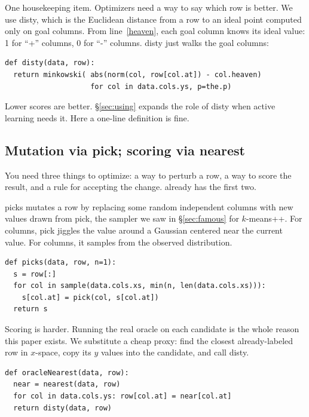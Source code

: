 One housekeeping item. Optimizers need a way to say which row is
better. We use \textsf{disty}, which is the Euclidean distance
from a row to an ideal point computed only on goal columns. From
line~\ref{heaven}, each goal column knows its ideal value: 1 for
``+'' columns, 0 for ``-'' columns. \textsf{disty} just walks the
goal columns:

\begin{verbatim}
def disty(data, row): 
  return minkowski( abs(norm(col, row[col.at]) - col.heaven)
                    for col in data.cols.ys, p=the.p)
\end{verbatim}

Lower scores are better. \S\ref{sec:using} expands the role of
\textsf{disty} when active learning needs it. Here a one-line
definition is fine.

\subsection{Mutation via \textsf{pick}; scoring via \textsf{nearest}}\label{spick}

You need three things to optimize: a way to perturb a row, a way
to score the result, and a rule for accepting the change. \IT{}
already has the first two.

\textsf{picks} mutates a row by replacing some random independent
columns with new values drawn from \textsf{pick}, the sampler we
saw in \S\ref{sec:famous} for $k$-means++. For  columns,
\textsf{pick} jiggles the value around a Gaussian centered near
the current value. For  columns, it samples from the
observed distribution.

\begin{verbatim}
def picks(data, row, n=1): 
  s = row[:]
  for col in sample(data.cols.xs, min(n, len(data.cols.xs))):
    s[col.at] = pick(col, s[col.at])
  return s
\end{verbatim}

Scoring is harder. Running the real oracle on each candidate is
the whole reason this paper exists. We substitute a cheap
proxy: find the closest already-labeled row in $x$-space, copy
its $y$ values into the candidate, and call \textsf{disty}.

\begin{verbatim}
def oracleNearest(data, row): 
  near = nearest(data, row)
  for col in data.cols.ys: row[col.at] = near[col.at]
  return disty(data, row)
\end{verbatim}

